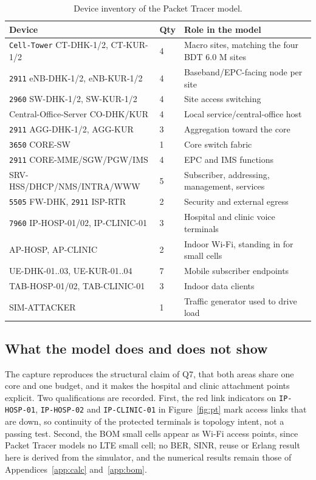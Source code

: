 \documentclass[9pt,a4paper]{extarticle}
\begin{document}
\begin{table}[H]\centering\footnotesize
\caption{Device inventory of the Packet Tracer model.}
\label{tab:ptinv}
\begin{tabularx}{\textwidth}{@{}p{5.3cm}p{0.8cm}X@{}}
\toprule
\textbf{Device} & \textbf{Qty} & \textbf{Role in the model} \\
\midrule
\texttt{Cell-Tower} CT-DHK-1/2, CT-KUR-1/2 & 4 & Macro sites, matching the four BDT 6.0 M sites \\
\texttt{2911} eNB-DHK-1/2, eNB-KUR-1/2 & 4 & Baseband/EPC-facing node per site \\
\texttt{2960} SW-DHK-1/2, SW-KUR-1/2 & 4 & Site access switching \\
Central-Office-Server CO-DHK/KUR & 4 & Local service/central-office host \\
\texttt{2911} AGG-DHK-1/2, AGG-KUR & 3 & Aggregation toward the core \\
\texttt{3650} CORE-SW & 1 & Core switch fabric \\
\texttt{2911} CORE-MME/SGW/PGW/IMS & 4 & EPC and IMS functions \\
SRV-HSS/DHCP/NMS/INTRA/WWW & 5 & Subscriber, addressing, management, services \\
\texttt{5505} FW-DHK, \texttt{2911} ISP-RTR & 2 & Security and external egress \\
\texttt{7960} IP-HOSP-01/02, IP-CLINIC-01 & 3 & Hospital and clinic voice terminals \\
AP-HOSP, AP-CLINIC & 2 & Indoor Wi-Fi, standing in for small cells \\
UE-DHK-01..03, UE-KUR-01..04 & 7 & Mobile subscriber endpoints \\
TAB-HOSP-01/02, TAB-CLINIC-01 & 3 & Indoor data clients \\
SIM-ATTACKER & 1 & Traffic generator used to drive load \\
\bottomrule
\end{tabularx}
\end{table}

\subsection{What the model does and does not show}
The capture reproduces the structural claim of Q7, that both areas share one core and one
budget, and it makes the hospital and clinic attachment points explicit. Two qualifications are
recorded. First, the red link indicators on \texttt{IP-HOSP-01}, \texttt{IP-HOSP-02} and
\texttt{IP-CLINIC-01} in Figure~\ref{fig:pt} mark access links that are down,
so continuity of the protected terminals is topology intent, not a passing test. Second, the
BOM small cells appear as Wi-Fi access points, since Packet Tracer models no LTE small cell; no
BER, SINR, reuse or Erlang result here is derived from the simulator, and the numerical results
remain those of Appendices~\ref{app:calc} and~\ref{app:bom}.
\end{document}
